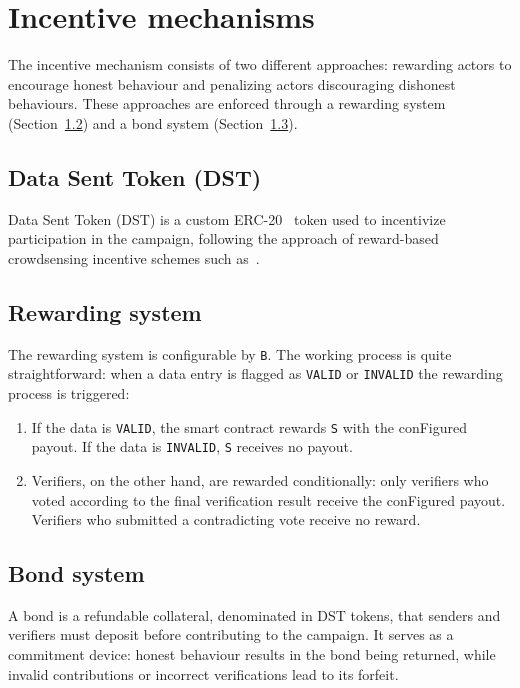 \section{Incentive mechanisms}\label{sec:incentive-mechanisms}
The incentive mechanism consists of two different approaches: rewarding actors to encourage honest behaviour and penalizing actors discouraging dishonest behaviours.
These approaches are enforced through a rewarding system (Section~\ref{subsec:proto-rewarding-model}) and a bond system (Section~\ref{subsec:proto-bond-model}).

\subsection{Data Sent Token (DST)}\label{subsec:data-sent-token}
Data Sent Token (DST) is a custom ERC-20~\cite{eip20} token used to incentivize participation in the campaign, following the approach of reward-based crowdsensing incentive schemes such as~\cite{ying2025chaser}.

\subsection{Rewarding system}\label{subsec:proto-rewarding-model}
The rewarding system is  configurable by \texttt{B}.
The working process is quite straightforward: when a data entry is flagged as \texttt{VALID} or \texttt{INVALID} the rewarding process is triggered:
\begin{enumerate}
    \item If the data is \texttt{VALID}, the smart contract rewards \texttt{S} with the conFigured payout. If the data is \texttt{INVALID}, \texttt{S} receives no payout.
    \item Verifiers, on the other hand, are rewarded conditionally: only verifiers who voted according to the final verification result receive the conFigured payout. Verifiers who submitted a contradicting vote receive no reward.
\end{enumerate}

\subsection{Bond system}\label{subsec:proto-bond-model}
A bond is a refundable collateral, denominated in DST tokens, that senders and verifiers must deposit before contributing to the campaign.
It serves as a commitment device: honest behaviour results in the bond being returned, while invalid contributions or incorrect verifications lead to its forfeit.

